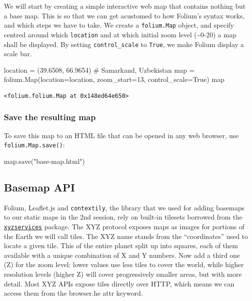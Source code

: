 \documentclass[
  letterpaper,
  DIV=11,
  numbers=noendperiod]{scrreprt}
\newenvironment{Shaded}{\begin{snugshade}}{\end{snugshade}}
\newcommand{\BuiltInTok}[1]{\textcolor[rgb]{0.00,0.23,0.31}{#1}}
\newcommand{\CommentTok}[1]{\textcolor[rgb]{0.37,0.37,0.37}{#1}}
\newcommand{\DecValTok}[1]{\textcolor[rgb]{0.68,0.00,0.00}{#1}}
\newcommand{\FloatTok}[1]{\textcolor[rgb]{0.68,0.00,0.00}{#1}}
\newcommand{\NormalTok}[1]{\textcolor[rgb]{0.00,0.23,0.31}{#1}}
\newcommand{\OperatorTok}[1]{\textcolor[rgb]{0.37,0.37,0.37}{#1}}
\newcommand{\StringTok}[1]{\textcolor[rgb]{0.13,0.47,0.30}{#1}}
\newcommand{\VariableTok}[1]{\textcolor[rgb]{0.07,0.07,0.07}{#1}}
\begin{document}
We will start by creating a simple interactive web map that contains
nothing but a base map. This is so that we can get acustomed to how
Folium's syntax works, and which steps we have to take. We create a
\texttt{folium.Map} object, and specify centred around which
\texttt{location} and at which initial zoom level (\textasciitilde0-20)
a map shall be displayed. By setting \texttt{control\_scale} to
\texttt{True}, we make Folium display a scale bar.

\begin{Shaded}
\begin{Highlighting}[]
\NormalTok{location }\OperatorTok{=}\NormalTok{ (}\FloatTok{39.6508}\NormalTok{, }\FloatTok{66.9654}\NormalTok{) }\CommentTok{\# Samarkand, Uzbekistan}
\BuiltInTok{map} \OperatorTok{=}\NormalTok{ folium.Map(location}\OperatorTok{=}\NormalTok{location, zoom\_start}\OperatorTok{=}\DecValTok{13}\NormalTok{, control\_scale}\OperatorTok{=}\VariableTok{True}\NormalTok{)}
\BuiltInTok{map}
\end{Highlighting}
\end{Shaded}

\begin{verbatim}
<folium.folium.Map at 0x148ed64e650>
\end{verbatim}

\subsubsection{Save the resulting map}\label{save-the-resulting-map}

To save this map to an HTML file that can be opened in any web browser,
use \texttt{folium.Map.save()}:

\begin{Shaded}
\begin{Highlighting}[]
\BuiltInTok{map}\NormalTok{.save(}\StringTok{"base{-}map.html"}\NormalTok{)}
\end{Highlighting}
\end{Shaded}

\subsection{Basemap API}\label{basemap-api}

Folium, Leaflet.js and \texttt{contextily}, the library that we used for
adding basemaps to our static maps in the 2nd session, rely on built-in
tilesets borrowed from the
\href{https://github.com/geopandas/xyzservices}{\texttt{xyzservices}}
package. The XYZ protocol exposes maps as images for portions of the
Earth we will call tiles. The XYZ name stands from the ``coordinates''
used to locate a given tile. This of the entire planet split up into
squares, each of them available with a unique combination of X and Y
numbers. Now add a third one (Z) for the zoom level: lower values use
less tiles to cover the world, while higher resolution levels (higher Z)
will cover progressively smaller areas, but with more detail. Most XYZ
APIs expose tiles directly over HTTP, which means we can access them
from the browser.he attr keyword.
\end{document}

